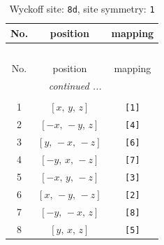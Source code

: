 \documentclass[fleqn,8pt]{jsarticle}
\begin{document}
\begin{longtable}{ccc}
\caption{Wyckoff site: {\tt 8d}, site symmetry: {\tt 1}}
 \\
 \hline \hline
No. & position & mapping \\ \hline \endfirsthead

\multicolumn{2}{l}{\tablename\ \thetable{}} \\
 \hline \hline
No. & position & mapping \\ \hline \endhead

 \hline \hline
\multicolumn{2}{r}{\footnotesize\it continued ...} \\ \endfoot

 \hline \hline
\multicolumn{2}{r}{} \\ \endlastfoot

1 & $\left[ x,\, y,\, z \right]$ & {\tt [1]} \\ \hline
2 & $\left[ - x,\, - y,\, z \right]$ & {\tt [4]} \\ \hline
3 & $\left[ y,\, - x,\, - z \right]$ & {\tt [6]} \\ \hline
4 & $\left[ - y,\, x,\, - z \right]$ & {\tt [7]} \\ \hline
5 & $\left[ - x,\, y,\, - z \right]$ & {\tt [3]} \\ \hline
6 & $\left[ x,\, - y,\, - z \right]$ & {\tt [2]} \\ \hline
7 & $\left[ - y,\, - x,\, z \right]$ & {\tt [8]} \\ \hline
8 & $\left[ y,\, x,\, z \right]$ & {\tt [5]} \\
\end{longtable}
\end{document}
